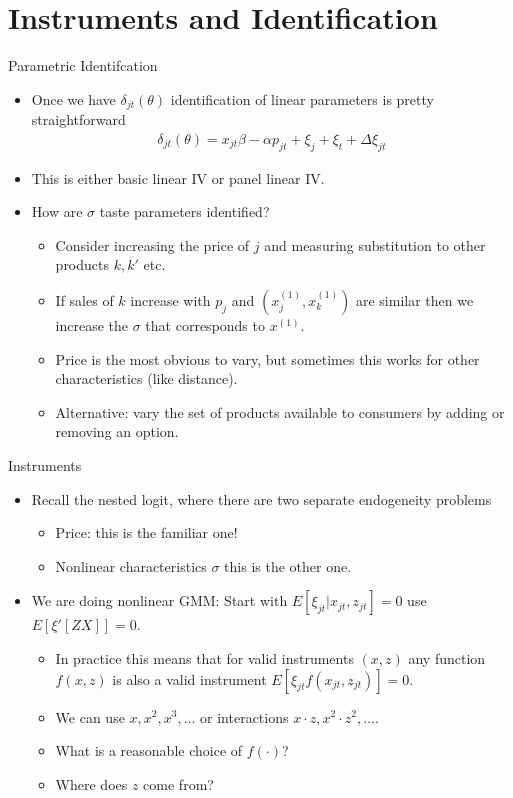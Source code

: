 \documentclass[xcolor=pdftex,dvipsnames,table,mathserif,aspectratio=169]{beamer}
\begin{document}
\section{Instruments and Identification}
\begin{frame}{Parametric Identifcation}
\begin{itemize}
\item Once we have $\delta_{jt}(\theta)$ identification of linear parameters is pretty straightforward
\begin{eqnarray*}
\delta_{jt}(\theta) = x_{jt} \beta - \alpha p_{jt} + \xi_j + \xi_t + \Delta \xi_{jt}
\end{eqnarray*}
\item This is either basic linear IV or panel linear IV.
\item How are $\sigma$ taste parameters identified?
\begin{itemize}
\item Consider increasing the price of $j$ and measuring substitution to other products $k,k'$ etc.
\item If sales of $k$ increase with $p_j$ and $(x_j^{(1)},x_k^{(1)})$ are similar then we increase the $\sigma$ that corresponds to $x^{(1)}$.
\item Price is the most obvious to vary, but sometimes this works for other characteristics (like distance).
\item Alternative: vary the set of products available to consumers by adding or removing an option.
\end{itemize}
\end{itemize}
\end{frame}




\begin{frame}{Instruments}
\begin{itemize}
\item Recall the nested logit, where there are two separate endogeneity problems
\begin{itemize}
\item \alert{Price}: this is the familiar one!
\item \alert{Nonlinear characteristics} $\sigma$ this is the other one.
\end{itemize}
\item We are doing nonlinear GMM: Start with $E[\xi_{jt} | x_{jt}, z_{jt}]=0$ use $E[\xi' [Z X]]=0$.
\begin{itemize}
\item In practice this means that for valid instruments $(x,z)$ any function $f(x,z)$ is also a valid instrument $E[ \xi_{jt} f(x_{jt},z_{jt})]=0$.
\item We can use $x, x^2, x^3,\ldots$ or interactions $x \cdot z, x^2 \cdot z^2, \ldots$.
\item What is a reasonable choice of $f(\cdot)$?
\item Where does $z$ come from?
\end{itemize}
\end{itemize}
\end{frame}
\end{document}
